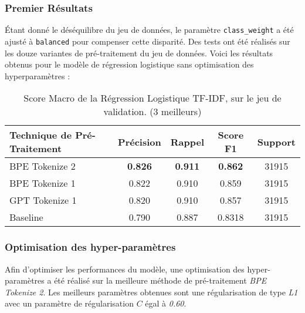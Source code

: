 \subsubsection{Premier Résultats}
Étant donné le déséquilibre du jeu de données, le paramètre \texttt{class\_weight} a été ajusté à \texttt{balanced} pour compenser cette disparité. 
Des tests ont été réalisés sur les douze variantes de pré-traitement du jeu de données.
Voici les résultats obtenus pour le modèle de régression logistique sans optimisation des hyperparamètres :

\begin{table}[ht]
    \centering
    \caption{Score Macro de la Régression Logistique TF-IDF, sur le jeu de validation. (3 meilleurs)}
    \begin{tabular}{lcccc}
    \hline
    \textbf{Technique de Pré-Traitement} & \textbf{Précision} & \textbf{Rappel} & \textbf{Score F1} & \textbf{Support} \\ \hline
    BPE Tokenize 2                       & \textbf{0.826}         & \textbf{0.911}         & \textbf{0.862}             & 31915            \\
    BPE Tokenize 1                           & 0.822              & 0.910                   & 0.859             & 31915            \\
    GPT Tokenize 1                              & 0.820              & 0.910                & 0.857             & 31915            \\ \hline
    Baseline                & 0.790              & 0.887           & 0.8318             & 31915            \\ \hline
    \end{tabular}
    \label{tab:results}
    \end{table}

\subsubsection{Optimisation des hyper-paramètres}
Afin d'optimiser les performances du modèle, une optimisation des hyper-paramètres a été réalisé sur la meilleure méthode de pré-traitement \textit{BPE Tokenize 2}. 
Les meilleurs paramètres obtenues sont une régularisation de type \textit{L1} avec un paramètre de régularisation $C$ égal à \textit{0.60}.

